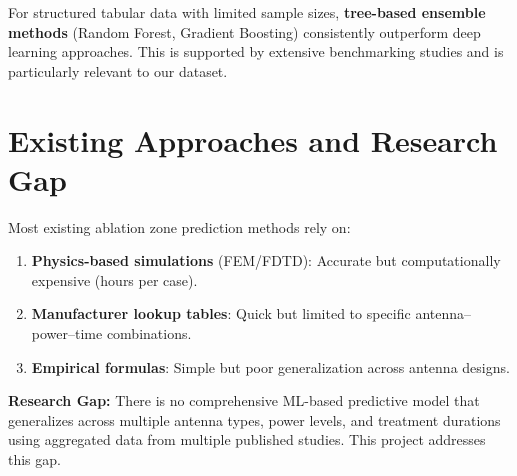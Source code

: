 For structured tabular data with limited sample sizes, \textbf{tree-based ensemble methods} (Random Forest, Gradient Boosting) consistently outperform deep learning approaches. This is supported by extensive benchmarking studies and is particularly relevant to our dataset.


\section{Existing Approaches and Research Gap}

Most existing ablation zone prediction methods rely on:

\begin{enumerate}
    \item \textbf{Physics-based simulations} (FEM/FDTD): Accurate but computationally expensive (hours per case).
    \item \textbf{Manufacturer lookup tables}: Quick but limited to specific antenna--power--time combinations.
    \item \textbf{Empirical formulas}: Simple but poor generalization across antenna designs.
\end{enumerate}

\textbf{Research Gap:} There is no comprehensive ML-based predictive model that generalizes across multiple antenna types, power levels, and treatment durations using aggregated data from multiple published studies. This project addresses this gap.
